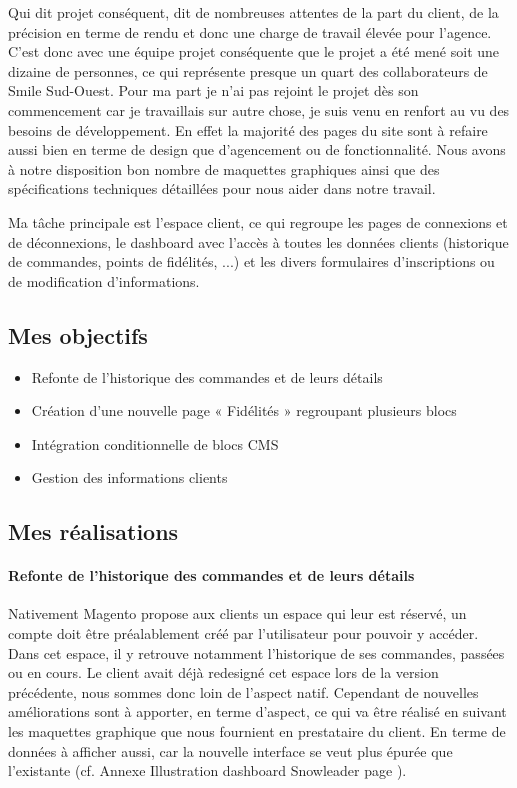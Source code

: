 \documentclass[a4paper,11pt,twoside]{report}
\begin{document}
    Qui dit projet conséquent, dit de nombreuses attentes de la part du client, de la précision en terme de rendu et donc une charge de travail élevée pour l'agence. C'est donc avec une équipe projet conséquente que le projet a été mené soit une dizaine de personnes, ce qui représente presque un quart des collaborateurs de Smile Sud-Ouest. Pour ma part je n'ai pas rejoint le projet dès son commencement car je travaillais sur autre chose, je suis venu en renfort au vu des besoins de développement. En effet la majorité des pages du site sont à refaire aussi bien en terme de design que d'agencement ou de fonctionnalité. Nous avons à notre disposition bon nombre de maquettes graphiques ainsi que des spécifications techniques détaillées pour nous aider dans notre travail. 
    
    Ma tâche principale est l'espace client, ce qui regroupe les pages de connexions et de déconnexions, le dashboard avec l'accès à toutes les données clients (historique de commandes, points de fidélités, ...) et les divers formulaires d'inscriptions ou de modification d'informations. 
    \subsection*{Mes objectifs}
      \begin{itemize}

	\item Refonte de l'historique des commandes et de leurs détails 
	\item Création d'une nouvelle page « Fidélités » regroupant plusieurs blocs
	\item Intégration conditionnelle de blocs CMS
	\item Gestion des informations clients

      \end{itemize}
    \subsection*{Mes réalisations}
    	\paragraph*{Refonte de l'historique des commandes et de leurs détails}
    	Nativement Magento propose aux clients un espace qui leur est réservé, un compte doit être préalablement créé par l'utilisateur pour pouvoir y accéder. Dans cet espace, il y retrouve notamment l'historique de ses commandes, passées ou en cours. Le client avait déjà redesigné cet espace lors de la version précédente, nous sommes donc loin de l'aspect natif. Cependant de nouvelles améliorations sont à apporter, en terme d'aspect, ce qui va être réalisé en suivant les maquettes graphique que nous fournient en prestataire du client. En terme de données à afficher aussi, car la nouvelle interface se veut plus épurée que l'existante (cf. Annexe Illustration dashboard Snowleader page \pageref{SL_dashboard_customer}). 
    
\end{document}
